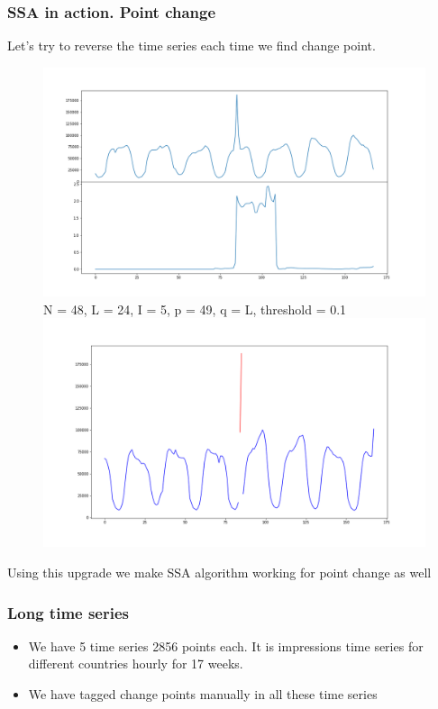\documentclass[intlimits, 9pt, unicode]{beamer}
\begin{document}
\begin{frame}
    \frametitle{SSA in action. Point change}
    
Let's try to reverse the time series each time we find change point.

\begin{figure}
	\includegraphics[scale=0.10]{images/023_point_cp_2}
	N = 48, L = 24, I = 5, p = 49, q = L, threshold = 0.1
	\includegraphics[scale=0.10]{images/024_point_cp_detected_2}
\end{figure}

Using this upgrade we make SSA algorithm working for point change as well

\end{frame}


\begin{frame}
    \frametitle{Long time series}

	\begin{itemize}
		\item We have 5 time series 2856 points each. It is impressions time series for different countries hourly for 17 weeks.
		\item We have tagged change points manually in all these time series
	\end{itemize}

\end{frame}
\end{document}
